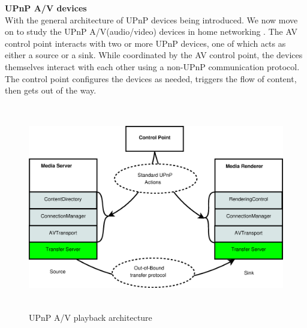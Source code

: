 \textbf{UPnP A/V devices}\\
With the general architecture of UPnP devices being introduced. We now move on to study the UPnP A/V(audio/video) devices in home networking \label{upnpav}. The AV 
control point interacts with two or more UPnP devices, one of which acts as either a source or a 
sink. While coordinated by the AV control point, the devices themselves interact with each other using a non-UPnP communication protocol. The control point configures the devices as needed, triggers the flow of content, then gets out of the way. 

\begin{figure}[htb] 
\centering \includegraphics[height=9cm]{charts/upnp_playback} 
\caption{UPnP A/V playback architecture \label{upnp_playback}} 
\end{figure} 

